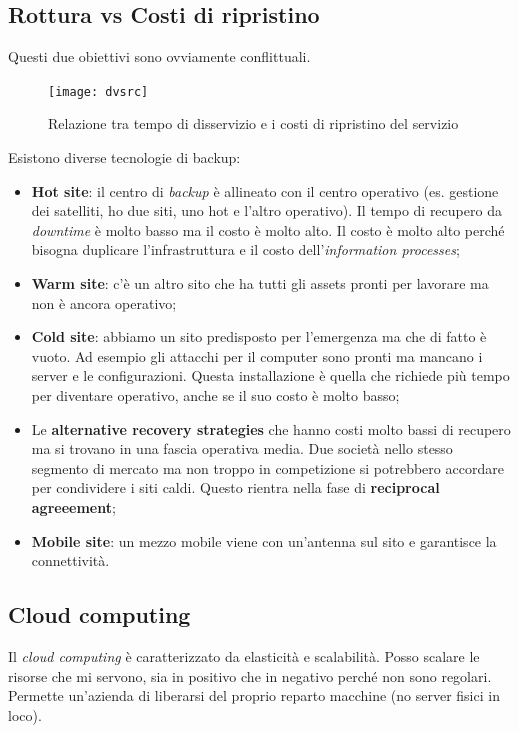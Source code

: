 \subsection{Rottura vs Costi di ripristino}

Questi due obiettivi sono ovviamente conflittuali.

\begin{figure}[H]
 \centering
 \texttt{[image: dvsrc]}
 \caption{Relazione tra tempo di disservizio e i costi di ripristino del servizio}
\end{figure}

Esistono diverse tecnologie di backup:
\begin{itemize}
  \item \textbf{Hot site}: il centro di \textit{backup} è allineato con il
  centro operativo (es. gestione dei satelliti, ho due siti, uno hot e l'altro
  operativo). Il tempo di recupero da \textit{downtime} è molto basso ma il
  costo è molto alto. Il costo è molto alto perché bisogna duplicare
  l'infrastruttura e il costo dell'\textit{information processes};
  \item \textbf{Warm site}: c'è un altro sito che ha tutti gli assets pronti
  per lavorare ma non è ancora operativo;
  \item \textbf{Cold site}: abbiamo un sito predisposto per l'emergenza ma che
  di fatto è vuoto. Ad esempio gli attacchi per il computer sono pronti ma
  mancano i server e le configurazioni. Questa installazione è quella che
  richiede più tempo per diventare operativo, anche se il suo costo è molto
  basso;
  \item Le \textbf{alternative recovery strategies} che hanno costi molto bassi
  di recupero ma si trovano in una fascia operativa media. Due società nello
  stesso segmento di mercato ma non troppo in competizione si potrebbero
  accordare per condividere i siti caldi. Questo rientra nella fase di
  \textbf{reciprocal agreeement};
  \item \textbf{Mobile site}: un mezzo mobile viene con un'antenna sul sito e
  garantisce la connettività.
\end{itemize}


\subsection{Cloud computing}

Il \textit{cloud computing} è caratterizzato da elasticità e scalabilità. Posso
scalare le risorse che mi servono, sia in positivo che in negativo perché non
sono regolari. Permette un'azienda di liberarsi del proprio reparto macchine
(no server fisici in loco).

